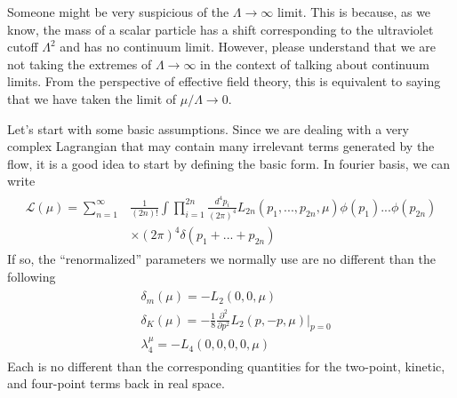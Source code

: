 \documentclass[12pt,halfline,a4paper]{ouparticle}
\begin{document}
Someone might be very suspicious of the $\Lambda\rightarrow\infty$ limit. This is because, as we know, the mass of a scalar particle has a shift corresponding to the ultraviolet cutoff $\Lambda^2$ and has no continuum limit.
However, please understand that we are not taking the extremes of $\Lambda\rightarrow\infty$ in the context of talking about continuum limits.
From the perspective of effective field theory, this is equivalent to saying that we have taken the limit of $\mu/\Lambda\rightarrow0$.


Let's start with some basic assumptions. Since we are dealing with a very complex Lagrangian that may contain many irrelevant terms generated by the flow, it is a good idea to start by defining the basic form. In fourier basis, we can write
\begin{align}
	\begin{split}
		\mathcal L(\mu) = \sum^\infty_{n=1}&\frac{1}{(2n)!}\int\prod^{2n}_{i=1}\frac{d^4p_i}{(2\pi)^4}L_{2n}(p_1,...,p_{2n},\mu)\phi(p_1)...\phi(p_{2n})\\
		&\times(2\pi)^4\delta(p_1+...+p_{2n})
	\end{split}
\end{align}
If so, the “renormalized” parameters we normally use are no different than the following
\begin{align}
	\begin{split}
		&\delta_m(\mu) = -L_2(0,0,\mu)\\
		&\delta_K(\mu) = -\frac{1}{8}\frac{\partial^2}{\partial p^2}L_2(p,-p,\mu)|_{p=0}\\
		&\lambda^\mu_4 = -L_4(0,0,0,0,\mu)
	\end{split}
\end{align}
Each is no different than the corresponding quantities for the two-point, kinetic, and four-point terms back in real space.
\end{document}

